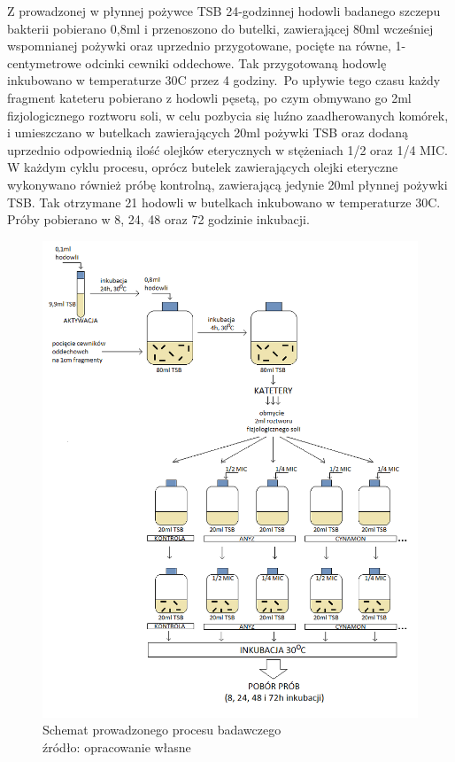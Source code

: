 \documentclass[11pt,a4paper]{report}
\begin{document}
Z prowadzonej w płynnej pożywce TSB 24-godzinnej hodowli badanego szczepu bakterii pobierano 0,8ml i przenoszono do butelki, zawierającej 80ml wcześniej wspomnianej pożywki oraz uprzednio przygotowane, pocięte na równe, 1-centymetrowe odcinki cewniki oddechowe.
Tak przygotowaną hodowlę inkubowano w temperaturze 30\degree C przez 4 godziny.\
Po upływie tego czasu każdy fragment kateteru pobierano z hodowli pęsetą, po czym obmywano go 2ml fizjologicznego roztworu soli, w celu pozbycia się luźno zaadherowanych komórek, i umieszczano w butelkach zawierających 20ml pożywki TSB oraz dodaną uprzednio odpowiednią ilość olejków eterycznych w stężeniach 1/2 oraz 1/4 MIC.
W każdym cyklu procesu, oprócz butelek zawierających olejki eteryczne wykonywano również próbę kontrolną, zawierającą jedynie 20ml płynnej pożywki TSB.
Tak otrzymane 21 hodowli w butelkach inkubowano w temperaturze 30\degree C.
Próby pobierano w 8, 24, 48 oraz 72 godzinie inkubacji.

\clearpage
\begin{figure}[!h]
\begin{center}
\includegraphics[scale=0.72]{img/mgr_metodyka.png}
\caption{Schemat prowadzonego procesu badawczego\\
źródło: opracowanie własne}\label{costam}
\end{center} 
\end{figure}
\clearpage
\end{document}
